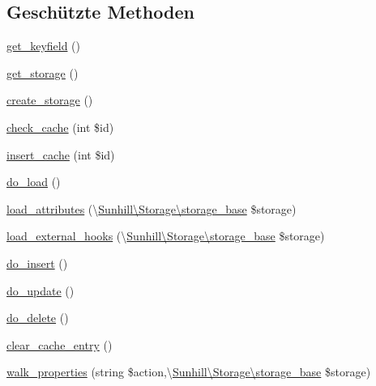 \subsection*{Geschützte Methoden}
\begin{DoxyCompactItemize}
\item 
\hyperlink{classSunhill_1_1Objects_1_1oo__object_ae7cf4319964b254e32c2b816e74f3c19}{get\+\_\+keyfield} ()
\item 
\hyperlink{classSunhill_1_1Objects_1_1oo__object_a6203c90d6c88365dde572e845712b4a1}{get\+\_\+storage} ()
\item 
\hyperlink{classSunhill_1_1Objects_1_1oo__object_a3b7f186c6c228011cd6fb035983403b8}{create\+\_\+storage} ()
\item 
\hyperlink{classSunhill_1_1Objects_1_1oo__object_a7f3b88726cf29ad9968f5f100e95e3c9}{check\+\_\+cache} (int \$id)
\item 
\hyperlink{classSunhill_1_1Objects_1_1oo__object_affd8a6f5e8d86c9f0c1497feb81ef04e}{insert\+\_\+cache} (int \$id)
\item 
\hyperlink{classSunhill_1_1Objects_1_1oo__object_a860acb0e3a32627a1c0e8455bf175214}{do\+\_\+load} ()
\item 
\hyperlink{classSunhill_1_1Objects_1_1oo__object_a78048073960c982da8b1d12b26952f1c}{load\+\_\+attributes} (\textbackslash{}\hyperlink{classSunhill_1_1Storage_1_1storage__base}{Sunhill\textbackslash{}\+Storage\textbackslash{}storage\+\_\+base} \$storage)
\item 
\hyperlink{classSunhill_1_1Objects_1_1oo__object_afa18a406cd6b553e994cb77c7be8b38c}{load\+\_\+external\+\_\+hooks} (\textbackslash{}\hyperlink{classSunhill_1_1Storage_1_1storage__base}{Sunhill\textbackslash{}\+Storage\textbackslash{}storage\+\_\+base} \$storage)
\item 
\hyperlink{classSunhill_1_1Objects_1_1oo__object_a3d78ef6761579745f92344c005cde2b1}{do\+\_\+insert} ()
\item 
\hyperlink{classSunhill_1_1Objects_1_1oo__object_ae77545642fc644fb026a8d1fa03f5f70}{do\+\_\+update} ()
\item 
\hyperlink{classSunhill_1_1Objects_1_1oo__object_acd026be33d0cec306f7fc54a89f15ad0}{do\+\_\+delete} ()
\item 
\hyperlink{classSunhill_1_1Objects_1_1oo__object_a63f49d95ad02d7379ba23931b04193d3}{clear\+\_\+cache\+\_\+entry} ()
\item 
\hyperlink{classSunhill_1_1Objects_1_1oo__object_a771a69a46b534b844859ae09f56aa017}{walk\+\_\+properties} (string \$action,\textbackslash{}\hyperlink{classSunhill_1_1Storage_1_1storage__base}{Sunhill\textbackslash{}\+Storage\textbackslash{}storage\+\_\+base} \$storage)

\end{DoxyCompactItemize}
